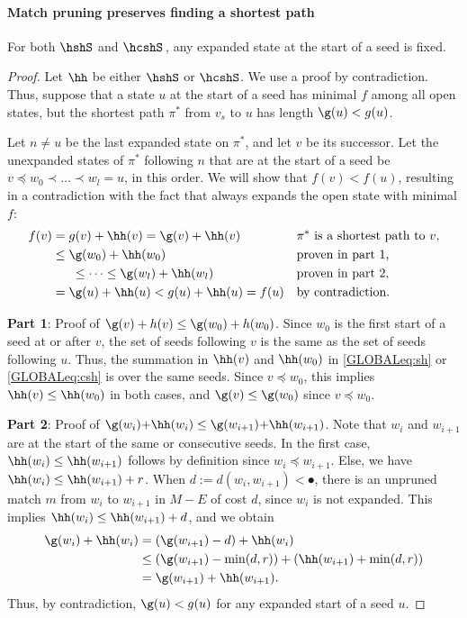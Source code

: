 \paragraph{Match pruning preserves finding a shortest path}\label{GLOBALsec:pruning-proof}

\begin{lem}\label{GLOBALprop:consistent}
  For both $\hshS$ and $\hcshS$\,, any expanded state at the start of a seed is fixed.
\end{lem}
\begin{proof}
  Let $\hh$ be either $\hshS$ or $\hcshS$.
  We use a proof by contradiction.
  Thus, suppose that a state $u$ at the start of a seed has minimal $f$ among
  all open states, but the shortest path $\pi^*$ from $v_s$ to $u$ has length $\g(u) < g(u)$.

  Let $n\neq u$ be the last expanded state on $\pi^*$, and let $v$ be its successor.
  Let the unexpanded states of $\pi^*$ following $n$ that are at the start of a seed be
  $v\preceq w_0 \prec \dots\prec w_l=u$, in this order. We will show that
  $f(v) < f(u)$, resulting in a contradiction with the fact that \A always
  expands the open state with minimal $f$:
  \begin{align*}
    f(v) &= g(v)+\hh(v)
         = \g(v)+\hh(v) && \text{$\pi^*$ is a shortest path to $v$,} \\
         &\leq \g(w_0)+\hh(w_0) && \text{proven in part 1,} \\
         &\phantom{aaa}\leq \cdots \leq \g(w_l)+\hh(w_l) && \text{proven in part 2,} \\
         &= \g(u)+\hh(u)
         < g(u)+\hh(u) = f(u) && \text{by contradiction.}
  \end{align*}

  \textbf{Part 1}: Proof of $\g(v)+h(v) \leq \g(w_0)+h(w_0)$.
  Since $w_0$ is the first start of a seed at or after $v$, the set of seeds
  following $v$ is the same as the set of seeds following $u$. Thus, the
  summation in $\hh(v)$ and $\hh(w_0)$ in \cref{GLOBALeq:sh} or \cref{GLOBALeq:csh} is over
  the same seeds. Since $v\preceq w_0$, this implies $\hh(v) \leq \hh(w_0)$ in
  both cases, and $\g(v) \leq \g(w_0)$ since $v\preceq w_0$.

  \textbf{Part 2}: Proof of $\g(w_i){+}\hh(w_i) \leq \g(w_{i+1}){+}\hh(w_{i+1})$.
  Note that $w_i$ and $w_{i+1}$ are at the start of the same or consecutive
  seeds. In the first case,
  $\hh(w_i) \leq \hh(w_{i+1})$ follows by definition since $w_i \preceq w_{i+1}$.
  Else, we have $\hh(w_i) \leq \hh(w_{i+1})+r$.
  When $d:=d(w_i, w_{i+1}) < \spot$, there is an unpruned match $m$ from $w_i$
  to $w_{i+1}$ in $M-E$ of cost $d$, since $w_i$ is not expanded.
  This implies $\hh(w_i) \leq \hh(w_{i+1}) + d$, and we obtain
  \begin{align*}
    \g(w_i) + \hh(w_i) &= (\g(w_{i+1}) - d) + \hh(w_i)\\
                       &\leq (\g(w_{i+1})-\min(d,r)) + (\hh(w_{i+1}) + \min(d,r))\\
                       &= \g(w_{i+1}) + \hh(w_{i+1}).
  \end{align*}
  Thus, by contradiction, $\g(u) < g(u)$ for any expanded start of a seed $u$.
\end{proof}

